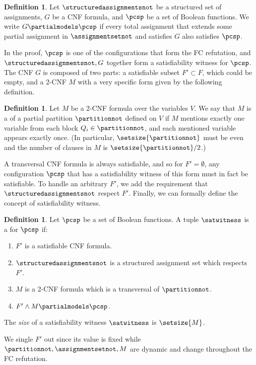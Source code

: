 \documentclass[11pt]{article}
\numberwithin{equation}{section}
\theoremstyle{definition}
\newtheorem{definition}[theorem]{Definition}
\theoremstyle{plain}
\begin{document}
\begin{definition}
  \label{def:partialmodels}
  Let $\structuredassignmentsnot$ be a structured set of assignments, $G$ be a
  CNF formula, and $\pcsp$ be a set of Boolean functions.
  We write $G \partialmodels \pcsp$ if every total assignment that extends some partial assignment in $\assignmentsetnot$ and satisfies $G$ also satisfies $\pcsp$.
\end{definition}

In the proof, $\pcsp$ is one of the configurations that form the FC refutation, and $\structuredassignmentsnot,G$ together form a satisfiability witness for $\pcsp$. The CNF $G$ is composed of two parts: a satisfiable subset $F' \subset F$, which could be empty, and a 2-CNF $M$ with a very specific form given by the following definition.

\begin{definition}
  \label{def:transversal}
  Let $M$ be a 2-CNF formula over the variables $V$. We say that $M$ is a  of a partial partition $\partitionnot$ defined on $V$ if $M$ mentions exactly one variable from each block $Q_i \in \partitionnot$, and each mentioned variable appears exactly once. (In particular, $\setsize{\partitionnot}$ must be even and the number of clauses in $M$ is $\setsize{\partitionnot}/2$.)
\end{definition}

A transversal CNF formula is always satisfiable, and so for $F' = \emptyset$, any configuration $\pcsp$ that has a satisfiability witness of this form must in fact be satisfiable. To handle an arbitrary $F'$, we add the requirement that $\structuredassignmentsnot$ respect $F'$. Finally, we can formally define the concept of satisfiability witness.
%

\begin{definition}
 \label{def:witness}
 Let $\pcsp$ be a set of Boolean functions. A tuple $\satwitness$ is a  for $\pcsp$ if:
\begin{enumerate}
 \item $F'$ is a satisfiable CNF formula.
 \item $\structuredassignmentsnot$ is a structured assignment set which respects $F'$.
 \item $M$ is a 2-CNF formula which is a transversal of $\partitionnot$.
 \item $F'\land M \partialmodels \pcsp$.
\end{enumerate}
 The \emph{size} of a satisfiability witness $\satwitness$ is $\setsize{M}$.
\end{definition}
We single $F'$ out since its value is fixed while $\partitionnot,\assignmentsetnot,M$ are dynamic and change throughout the FC refutation.
\end{document}
